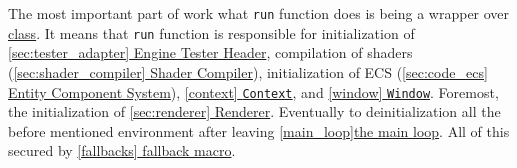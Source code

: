 The most important part of work what \texttt{run} function does is being a wrapper over \hyperref[lst:engine_class]{ class}. It means that \texttt{run} function is responsible for initialization of \hyperref[sec:tester_adapter]{\ref*{sec:tester_adapter} Engine Tester Header}, compilation of shaders (\hyperref[sec:shader_compiler]{\ref*{sec:shader_compiler} Shader Compiler}), initialization of ECS (\hyperref[sec:code_ecs]{\ref*{sec:code_ecs} Entity Component System}), \hyperref[context]{\ref*{context} \texttt{Context}}, and \hyperref[window]{\ref*{window} \texttt{Window}}. Foremost, the initialization of \hyperref[sec:renderer]{\ref*{sec:renderer} Renderer}. Eventually to deinitialization all the before mentioned environment after leaving \hyperref[main_loop]{\ref*{main_loop}the main loop}. All of this secured by \hyperref[fallbacks]{\ref*{fallbacks} fallback macro}.

